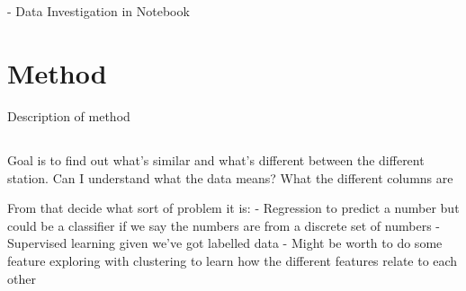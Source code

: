 \documentclass{article}
\begin{document}
    \subsection*{}

    \subsubsection*{}
    - Data Investigation in Notebook

    \section{Method}\label{sec:method}

    Description of method\\

    \subsection*{}

    \subsubsection*{}
    Goal is to find out what's similar and what's different between the different station.
    Can I understand what the data means? What the different columns are

    From that decide what sort of problem it is:
    - Regression to predict a number but could be a classifier if we say the numbers are from a discrete set of numbers
    - Supervised learning given we've got labelled data
    - Might be worth to do some feature exploring with clustering to learn how the different features relate to each other
\end{document}
